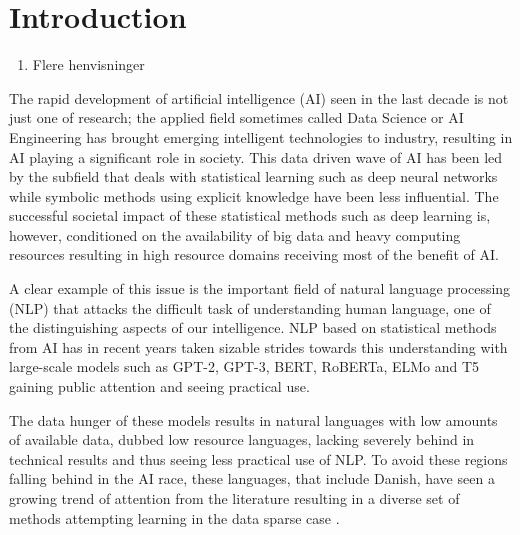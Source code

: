 \documentclass[main.tex]{subfiles}
\begin{document}
\chapter{Introduction}
\begin{enumerate}
    \item Flere henvisninger
\end{enumerate}
The rapid development of artificial intelligence (AI) seen in the last decade is not just one of research;
the applied field sometimes called Data Science or AI Engineering has brought emerging intelligent technologies to industry, resulting in AI playing a significant role in society.  This data driven wave of AI has been led by the subfield that deals with statistical learning such as deep neural networks while symbolic methods using explicit knowledge have been less influential.
The successful societal impact of these statistical methods such as deep learning is, however, conditioned on the availability of big data and heavy computing resources resulting in high resource domains receiving most of the benefit of AI.

A clear example of this issue is the important field of natural language processing (NLP) that attacks the difficult task of understanding human language, one of the distinguishing aspects of our intelligence.
NLP based on statistical methods from AI has in recent years taken sizable strides towards this understanding with large-scale models such as GPT-2, GPT-3, BERT, RoBERTa, ELMo and T5 gaining public attention and seeing practical use.

The data hunger of these models results in natural languages with low amounts of available data, dubbed low resource languages, lacking severely behind in technical results and thus seeing less practical use of NLP.
To avoid these regions falling behind in the AI race, these languages, that include Danish, have seen a growing trend of attention from the literature resulting in a diverse set of methods attempting learning in the data sparse case \cite{hedderich2021survey}.
\end{document}
